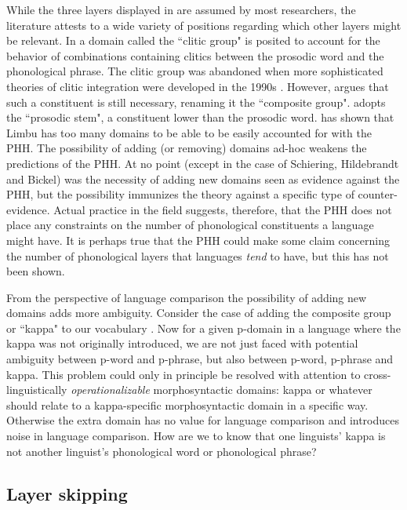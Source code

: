 \documentclass[output=paper,hidelinks]{langscibook}
\begin{document}
While the three layers displayed in  are assumed by most researchers, the literature attests to a wide variety of positions regarding which other layers might be relevant. In \citet{nespor2007prosodic} a domain called the ``clitic group" is posited to account for the behavior of combinations containing clitics between the prosodic word and the phonological phrase. The clitic group was abandoned when more sophisticated theories of clitic integration were developed in the 1990s \citep{booij1996cliticization, selkirk1996prosodic, peperkamp1996prosodic, peperkamp1997prosodic}. However, \citet{vogel2008morphology} argues that such a constituent is still necessary, renaming it the ``composite group". \citet{downing2020re} adopts the ``prosodic stem", a constituent lower than the prosodic word. \citet{hildebrandt2007grammatical} has shown that Limbu has too many domains to be able to be easily accounted for with the PHH.
The possibility of adding (or removing) domains ad-hoc weakens the predictions of the PHH. At no point (except in the case of Schiering, Hildebrandt and Bickel) was the necessity of adding new domains seen as evidence against the PHH, but the possibility immunizes the theory against a specific type of counter-evidence. Actual practice in the field suggests, therefore, that the PHH does not place any constraints on the number of phonological constituents a language might have. It is perhaps true that the PHH could make some claim concerning the number of phonological layers that languages \textit{tend} to have, but this has not been shown.

From the perspective of language comparison the possibility of adding new domains adds more ambiguity. Consider the case of adding the composite group or ``kappa" to our vocabulary \citep{miller2018phonology, vogel2019life}. Now for a given p-domain in a language where the kappa was not originally introduced, we are not just faced with potential ambiguity between p-word and p-phrase, but also between p-word, p-phrase and kappa. This problem could only in principle be resolved with attention to cross-linguistically \textit{operationalizable} morphosyntactic domains: kappa or whatever should relate to a kappa-specific morphosyntactic domain in a specific way. Otherwise the extra domain has no value for language comparison and introduces noise in language comparison. How are we to know that one linguists' kappa is not another linguist's phonological word or phonological phrase?

\subsection{Layer skipping}
\label{sec:layerskipping}
\end{document}
